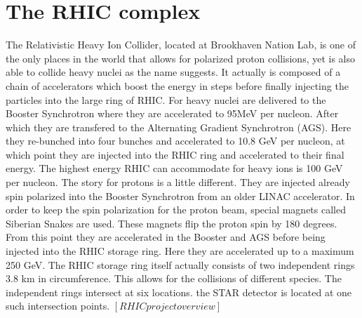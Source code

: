 \documentclass[abstract = on,listof=totoc, bibliography=totoc]{scrreprt}
\begin{document}
\section{The RHIC complex}
The Relativistic Heavy Ion Collider, located at Brookhaven Nation Lab, is one of the only places in the world that allows for polarized proton collisions, yet is also able to collide heavy nuclei as the name suggests. It actually is composed of a chain of accelerators which boost the energy in steps before finally injecting the particles into the large ring of RHIC. For heavy nuclei are delivered to the Booster Synchrotron where they are accelerated to 95MeV per nucleon. After which they are transfered to the Alternating Gradient Synchrotron (AGS). Here they re-bunched into four bunches and accelerated to 10.8 GeV per nucleon, at which point they are injected into the RHIC ring and accelerated to their final energy. The highest energy RHIC can accommodate for heavy ions is 100 GeV per nucleon. 
The story for protons is a little different. They are injected already spin polarized into the Booster Synchrotron from an older LINAC accelerator. In order to keep the spin polarization for the proton beam, special magnets called Siberian Snakes are used. These magnets flip the proton spin by 180 degrees. From this point they are accelerated in the Booster and AGS before being injected into the RHIC storage ring. Here they are accelerated up to a maximum 250 GeV. 
The RHIC storage ring itself actually consists of two independent rings 3.8 km in circumference. This allows for the collisions of different species. The independent rings intersect at six locations. the STAR detector is located at one such intersection points. $\left[RHIC project overview\right]$
\end{document}
